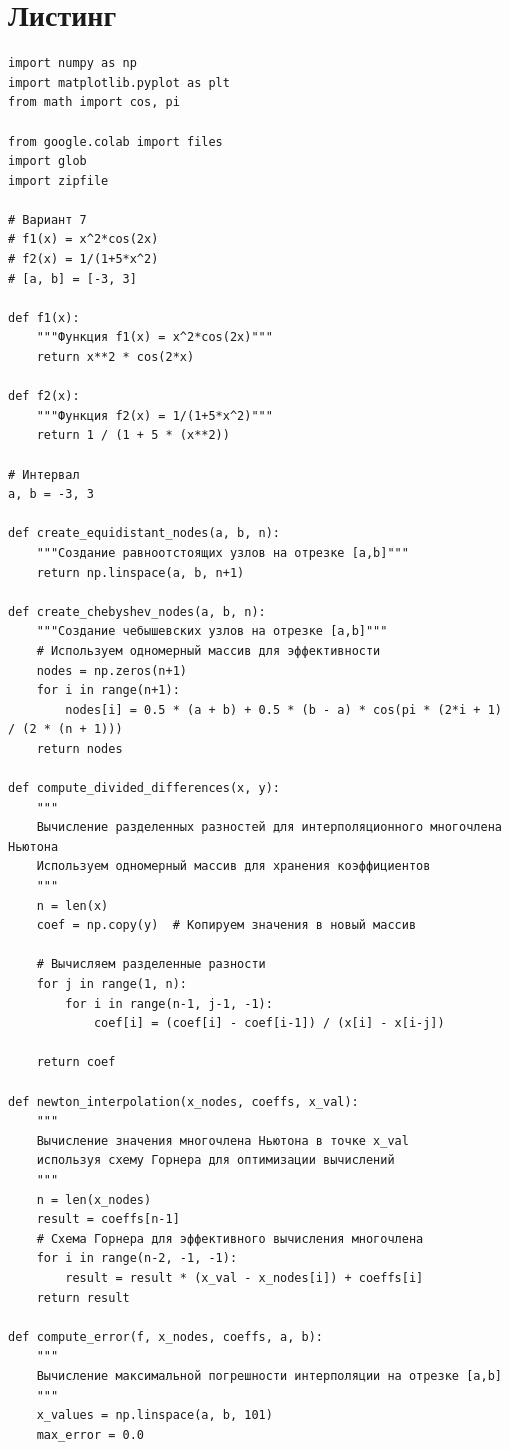 \documentclass[12pt]{article}
\begin{document}
\section{Листинг}
\begin{verbatim}
import numpy as np
import matplotlib.pyplot as plt
from math import cos, pi

from google.colab import files
import glob
import zipfile

# Вариант 7
# f1(x) = x^2*cos(2x)
# f2(x) = 1/(1+5*x^2)
# [a, b] = [-3, 3]

def f1(x):
    """Функция f1(x) = x^2*cos(2x)"""
    return x**2 * cos(2*x)

def f2(x):
    """Функция f2(x) = 1/(1+5*x^2)"""
    return 1 / (1 + 5 * (x**2))

# Интервал
a, b = -3, 3

def create_equidistant_nodes(a, b, n):
    """Создание равноотстоящих узлов на отрезке [a,b]"""
    return np.linspace(a, b, n+1)

def create_chebyshev_nodes(a, b, n):
    """Создание чебышевских узлов на отрезке [a,b]"""
    # Используем одномерный массив для эффективности
    nodes = np.zeros(n+1)
    for i in range(n+1):
        nodes[i] = 0.5 * (a + b) + 0.5 * (b - a) * cos(pi * (2*i + 1) / (2 * (n + 1)))
    return nodes

def compute_divided_differences(x, y):
    """
    Вычисление разделенных разностей для интерполяционного многочлена Ньютона
    Используем одномерный массив для хранения коэффициентов
    """
    n = len(x)
    coef = np.copy(y)  # Копируем значения в новый массив
    
    # Вычисляем разделенные разности
    for j in range(1, n):
        for i in range(n-1, j-1, -1):
            coef[i] = (coef[i] - coef[i-1]) / (x[i] - x[i-j])
    
    return coef

def newton_interpolation(x_nodes, coeffs, x_val):
    """
    Вычисление значения многочлена Ньютона в точке x_val 
    используя схему Горнера для оптимизации вычислений
    """
    n = len(x_nodes)
    result = coeffs[n-1]
    # Схема Горнера для эффективного вычисления многочлена
    for i in range(n-2, -1, -1):
        result = result * (x_val - x_nodes[i]) + coeffs[i]
    return result

def compute_error(f, x_nodes, coeffs, a, b):
    """
    Вычисление максимальной погрешности интерполяции на отрезке [a,b]
    """
    x_values = np.linspace(a, b, 101)
    max_error = 0.0
    

\end{verbatim}
\end{document}
